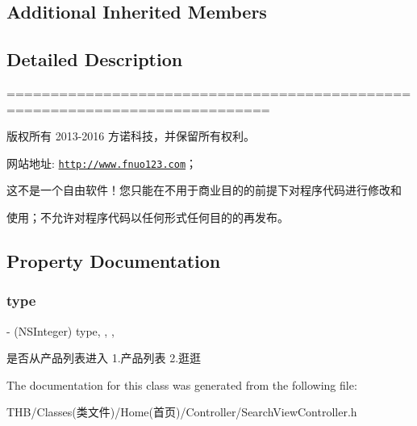 \subsection*{Additional Inherited Members}


\subsection{Detailed Description}
============================================================================

版权所有 2013-\/2016 方诺科技，并保留所有权利。

网站地址\+: \href{http://www.fnuo123.com}{\tt http\+://www.\+fnuo123.\+com}； 



这不是一个自由软件！您只能在不用于商业目的的前提下对程序代码进行修改和

使用；不允许对程序代码以任何形式任何目的的再发布。 

 

\subsection{Property Documentation}
\mbox{\label{interface_search_view_controller_a19f66c74b82b10695056b06087bfc773}} 
\subsubsection{\texorpdfstring{type}{type}}
{\footnotesize\ttfamily -\/ (N\+S\+Integer) type\hspace{0.3cm}{\ttfamily [read]}, {\ttfamily [write]}, {\ttfamily [nonatomic]}, {\ttfamily [assign]}}

是否从产品列表进入 1.产品列表 2.逛逛 

The documentation for this class was generated from the following file\+:\begin{DoxyCompactItemize}
\item 
T\+H\+B/\+Classes(类文件)/\+Home(首页)/\+Controller/Search\+View\+Controller.\+h\end{DoxyCompactItemize}
